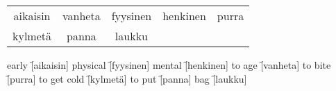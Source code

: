 \begin{center}
  \begin{tabular}{|c c c c c|}
    \hline
    aikaisin & vanheta & fyysinen & henkinen & purra \\
    kylmetä & panna & laukku &&\\
    \hline
  \end{tabular}
\end{center}

\begin{questions}
  \begin{multicols}{3}
    \raggedcolumns
    \question early \f[aikaisin]
    \question physical \f[fyysinen]
    \question mental \f[henkinen]
    \question to age \f[vanheta]
    \question to bite \f[purra]
    \question to get cold \f[kylmetä]
    \question to put \f[panna]
    \question bag \f[laukku]
  \end{multicols}
\end{questions}
